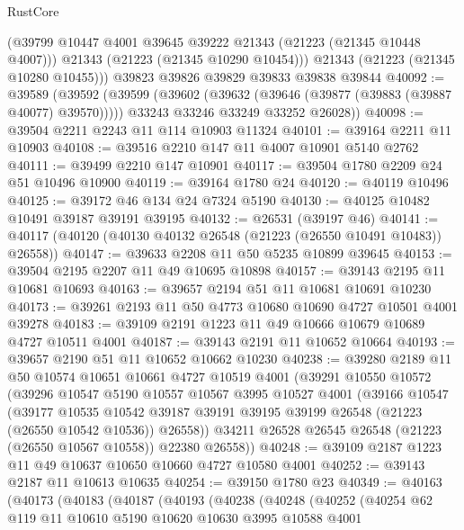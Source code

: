 \begin{lexlean}{RustCore}
\begin{coremodule}
        (@39799 @10447 @4001 @39645 @39222 @21343 (@21223 (@21345 @10448 @4007)))
        @21343
        (@21223 (@21345 @10290 @10454)))
      @21343
      (@21223 (@21345 @10280 @10455)))
    @39823
    @39826
    @39829
    @39833
    @39838
    @39844
@40092 := @39589
    (@39592
      (@39599
        (@39602 (@39632 (@39646 (@39877 (@39883 (@39887 @40077) @39570)))))
        @33243
        @33246
        @33249
        @33252
        @26028))
@40098 := @39504 @2211 @2243 @11 @114 @10903 @11324
@40101 := @39164 @2211 @11 @10903
@40108 := @39516 @2210 @147 @11 @4007 @10901 @5140 @2762
@40111 := @39499 @2210 @147 @10901
@40117 := @39504 @1780 @2209 @24 @51 @10496 @10900
@40119 := @39164 @1780 @24
@40120 := @40119 @10496
@40125 := @39172 @46 @134 @24 @7324 @5190
@40130 := @40125 @10482 @10491 @39187 @39191 @39195
@40132 := @26531 (@39197 @46)
@40141 := @40117 (@40120 (@40130 @40132 @26548 (@21223 (@26550 @10491 @10483)) @26558))
@40147 := @39633 @2208 @11 @50 @5235 @10899 @39645
@40153 := @39504 @2195 @2207 @11 @49 @10695 @10898
@40157 := @39143 @2195 @11 @10681 @10693
@40163 := @39657 @2194 @51 @11 @10681 @10691 @10230
@40173 := @39261 @2193 @11 @50 @4773 @10680 @10690 @4727 @10501 @4001 @39278
@40183 := @39109 @2191 @1223 @11 @49 @10666 @10679 @10689 @4727 @10511 @4001
@40187 := @39143 @2191 @11 @10652 @10664
@40193 := @39657 @2190 @51 @11 @10652 @10662 @10230
@40238 := @39280
    @2189
    @11
    @50
    @10574
    @10651
    @10661
    @4727
    @10519
    @4001
    (@39291
      @10550
      @10572
      (@39296
        @10547
        @5190
        @10557
        @10567
        @3995
        @10527
        @4001
        (@39166
          @10547
          (@39177
            @10535
            @10542
            @39187
            @39191
            @39195
            @39199
            @26548
            (@21223 (@26550 @10542 @10536))
            @26558))
        @34211
        @26528
        @26545
        @26548
        (@21223 (@26550 @10567 @10558))
        @22380
        @26558))
@40248 := @39109 @2187 @1223 @11 @49 @10637 @10650 @10660 @4727 @10580 @4001
@40252 := @39143 @2187 @11 @10613 @10635
@40254 := @39150 @1780 @23
@40349 := @40163
    (@40173
      (@40183
        (@40187
          (@40193
            (@40238
              (@40248
                (@40252
                  (@40254
                    @62
                    @119
                    @11
                    @10610
                    @5190
                    @10620
                    @10630
                    @3995
                    @10588
                    @4001

\end{coremodule}
\end{lexlean}

